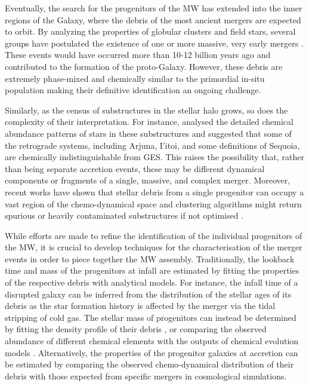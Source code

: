 Eventually, the search for the progenitors of the MW has extended into the inner regions of the Galaxy, where the debris of the most ancient mergers are expected to orbit. By analyzing the properties of globular clusters and field stars, several groups have postulated the existence of one or more massive, very early mergers \citep{Kruijssen2020,Horta2021,Malhan2024}. These events would have occurred more than 10-12 billion years ago and contributed to the formation of the proto-Galaxy. However, these debris are extremely phase-mixed and chemically similar to the primordial in-situ population \citep{Belokurov2023b} making their definitive identification an ongoing challenge.  

Similarly, as the census of substructures in the stellar halo grows, so does the complexity of their interpretation. For instance, \citet{Horta2023} analysed the detailed chemical abundance patterns of stars in these substructures and suggested that some of the retrograde systems, including Arjuna, I'itoi, and some definitions of Sequoia, are chemically indistinguishable from GES. This raises the possibility that, rather than being separate accretion events, these may be different dynamical components or fragments of a single, massive, and complex merger. Moreover, recent works have shown that stellar debris from a single progenitor can occupy a vast region of the chemo-dynamical space \citep{JeanBaptiste2017,Mori2024} and clustering algorithms might return spurious or heavily contaminated substructures if not optimised \citep{Thomas2025,Sante2025b}.  

While efforts are made to refine the identification of the individual progenitors of the MW, it is crucial to develop techniques for the characterisation of the merger events in order to piece together the MW assembly. Traditionally, the lookback time and mass of the progenitors at infall are estimated by fitting the properties of the respective debris with analytical models. For instance, the infall time of a disrupted galaxy can be inferred from the distribution of the stellar ages of its debris \citep{Gallart2019,Montalban2021,Woody2025} as the star formation history is affected by the merger via the tidal stripping of cold gas. The stellar mass of progenitors can instead be determined by fitting the density profile of their debris \citep{Mackereth2020,Han2022,Lane2023}, or comparing the observed abundance of different chemical elements with the outputs of chemical evolution models \citep{Vincenzo2019,Hasselquist2021}. Alternatively, the properties of the progenitor galaxies at accretion can be estimated by comparing the observed chemo-dynamical distribution of their debris with those expected from specific mergers in cosmological simulations. 

